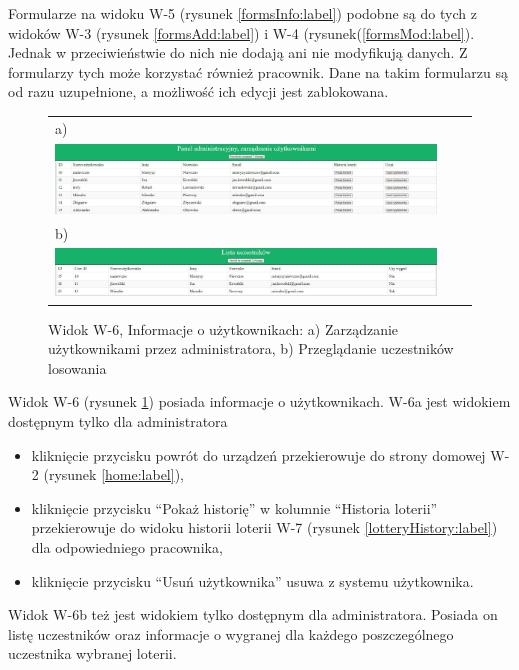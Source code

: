 Formularze na widoku W-5 (rysunek \ref{formsInfo:label}) podobne są do tych z widoków W-3 (rysunek \ref{formsAdd:label}) i W-4 (rysunek(\ref{formsMod:label}). Jednak w przeciwieństwie do nich nie dodają ani nie modyfikują danych. Z formularzy tych może korzystać również pracownik. Dane na takim formularzu są od razu uzupełnione, a możliwość ich edycji jest zablokowana. 

\begin{figure}[H]
  \centering
	\begin{tabular}{@{}lll@{}}
	a)\\
  \includegraphics[width=\textwidth]{rys05/view/manageUsers.pdf} \\
	
	b)\\
	\includegraphics[width=\textwidth]{rys05/view/participation.pdf} \\
	
	\end{tabular}
  \caption{Widok W-6, Informacje o użytkownikach: a) Zarządzanie użytkownikami przez administratora, b) Przeglądanie uczestników losowania}
  \label{manageUsers:label}
\end{figure}


Widok W-6 (rysunek \ref{manageUsers:label}) posiada informacje o użytkownikach. W-6a jest widokiem dostępnym tylko dla administratora
\begin{itemize}
	\item kliknięcie przycisku powrót do urządzeń przekierowuje do strony domowej W-2 (rysunek \ref{home:label}),
	\item kliknięcie przycisku "`Pokaż historię"' w kolumnie "`Historia loterii"' przekierowuje do widoku historii loterii  W-7 (rysunek \ref{lotteryHistory:label}) dla odpowiedniego pracownika,
	\item kliknięcie przycisku "`Usuń użytkownika"' usuwa z systemu użytkownika.
\end{itemize}
Widok W-6b też jest widokiem tylko dostępnym dla administratora. Posiada on listę uczestników oraz informacje o wygranej dla każdego poszczególnego uczestnika wybranej loterii.


